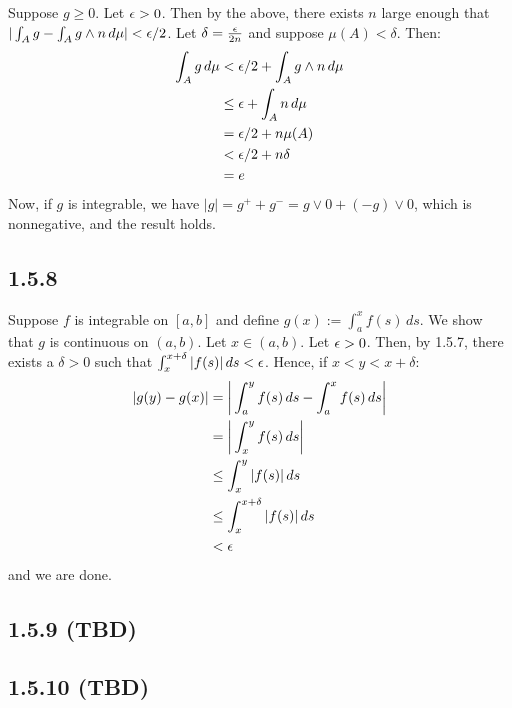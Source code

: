 \documentclass[11pt]{article}
\begin{document}
Suppose $g \geq 0$. Let $\epsilon >0$. Then by the above, there exists $n$ large enough that $|\int_A g  -\int_A g \wedge n\,d\mu| < \epsilon/2$. Let $\delta = \frac{\epsilon}{2n}$ and suppose $\mu(A) < \delta$. Then: \begin{align*}
    \int_A g  \,d\mu &< \epsilon/2 + \int_A g \wedge n\,d\mu  \\
    &\leq \epsilon + \int_A n\,d\mu  \\
    &= \epsilon/2 + n\mu(A) \\
    &< \epsilon/2 + n \delta \\
    &= e
\end{align*}
Now, if $g$ is integrable, we have $|g| = g^+ + g^- = g\vee 0 + (-g)\vee 0$, which is nonnegative, and the result holds.

\subsection*{1.5.8}

Suppose $f$ is integrable on $[a,b]$ and define $g(x) := \int_a^x f(s) \,ds$. We show that $g$ is continuous on $(a,b)$. Let $x \in (a,b)$. Let $\epsilon > 0$. Then, by 1.5.7, there exists a $\delta > 0$ such that $\int_{x}^{x + \delta} |f(s)|  \,ds < \epsilon$. Hence, if $x <y <x+\delta$: \begin{align*}
    |g(y) - g(x)| &= \bigg| \int_a^y f(s) \,ds - \int_a^x f(s) \,ds\bigg| \\
    &= \bigg| \int_x^y f(s) \,ds \bigg|\\
    &\leq  \int_x^y |f(s)| \,ds \\
    &\leq \int_x^{x+\delta} |f(s)| \,ds \\
    &< \epsilon
\end{align*} and we are done.

\subsection*{1.5.9 (TBD)}
\subsection*{1.5.10 (TBD)}
\end{document}
